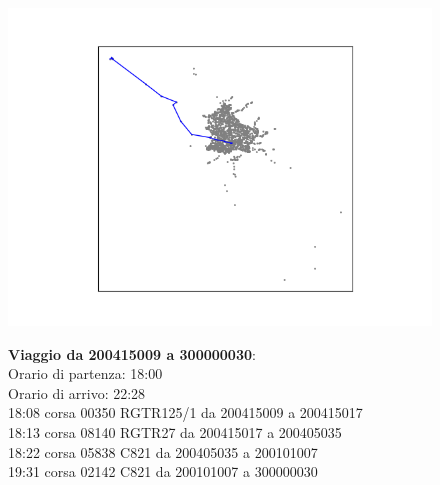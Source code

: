 \documentclass{article}
\begin{document}
\begin{figure}[H]
	\begin{minipage}{0.55\linewidth}
		\centering
		\hspace*{-3cm}\includegraphics[width=1.0\linewidth, valign=t]{figures/200415009_300000030}
	\end{minipage}
	\hspace*{-2cm}\begin{minipage}{0.7\linewidth}
		\textbf{Viaggio da 200415009 a 300000030}:\\
		Orario di partenza: 18:00\\
		Orario di arrivo: 22:28\\
		18:08 corsa 00350 RGTR125/1 da 200415009 a 200415017\\
		18:13 corsa 08140 RGTR27 da 200415017 a 200405035\\
		18:22 corsa 05838 C821 da 200405035 a 200101007\\
		19:31 corsa 02142 C821 da 200101007 a 300000030
		
		
			\end{minipage}
\end{figure}
\end{document}

